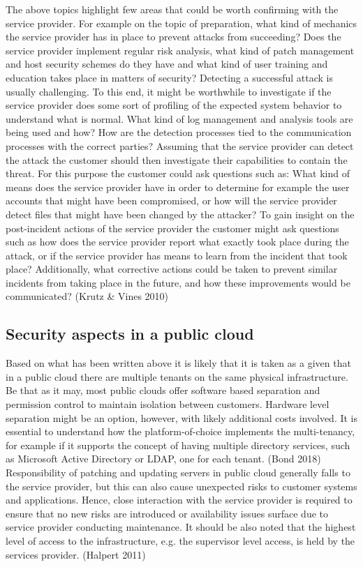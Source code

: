 \documentclass{article}
\begin{document}
The above topics highlight few areas that could be worth confirming with the service provider. For example on the topic of preparation, what kind of mechanics the service provider has in place to prevent attacks from succeeding? Does the service provider implement regular risk analysis, what kind of patch management and host security schemes do they have and what kind of user training and education takes place in matters of security? Detecting a successful attack is usually challenging. To this end, it might be worthwhile to investigate if the service provider does some sort of profiling of the expected system behavior to understand what is normal. What kind of log management and analysis tools are being used and how? How are the detection processes tied to the communication processes with the correct parties? Assuming that the service provider can detect the attack the customer should then investigate their capabilities to contain the threat. For this purpose the customer could ask questions such as: What kind of means does the service provider have in order to determine for example the user accounts that might have been compromised, or how will the service provider detect files that might have been changed by the attacker? To gain insight on the post-incident actions of the service provider the customer might ask questions such as how does the service provider report what exactly took place during the attack, or if the service provider has means to learn from the incident that took place? Additionally, what corrective actions could be taken to prevent similar incidents from taking place in the future, and how these improvements would be communicated? (Krutz \& Vines 2010)
\subsection{Security aspects in a public cloud}
Based on what has been written above it is likely that it is taken as a given that in a public cloud there are multiple tenants on the same physical infrastructure.
Be that as it may, most public clouds offer software based separation and permission control to maintain isolation between customers. Hardware level separation might be an option, however, with likely additional costs involved. It is essential to understand how the platform-of-choice implements the multi-tenancy, for example if it supports the concept of having multiple directory services, such as Microsoft Active Directory or LDAP, one for each tenant. (Bond  2018)
Responsibility of patching and updating servers in public cloud generally falls to the service provider, but this can also cause unexpected risks to customer systems and applications. Hence, close interaction with the service provider is required to ensure that no new risks are introduced  or availability issues surface due to service provider conducting maintenance. 
It should be also noted that the highest level of access to the infrastructure, e.g. the supervisor level access, is held by the services provider. (Halpert 2011)
\end{document}
